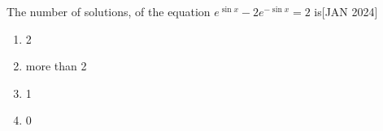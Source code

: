     \bigskip
    \item The number of solutions, of the equation $e^{\sin
    {x}} - 2e^{-\sin{x}} = 2$ is\hfill{[JAN 2024]}
    \begin{multicols}{4}
    \begin{enumerate}
        \item 2
        \item more than 2
        \item 1
        \item 0
    \end{enumerate} 
    \end{multicols}
    \bigskip


